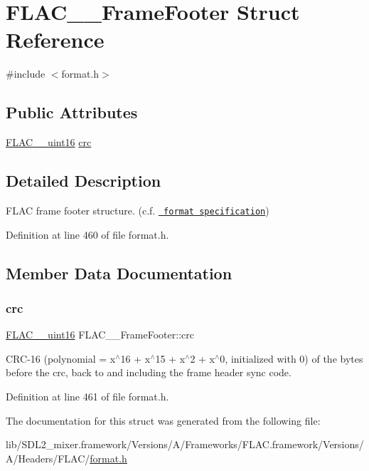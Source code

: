 \hypertarget{struct_f_l_a_c_____frame_footer}{}\section{F\+L\+A\+C\+\_\+\+\_\+\+Frame\+Footer Struct Reference}
\label{struct_f_l_a_c_____frame_footer}


{\ttfamily \#include $<$format.\+h$>$}

\subsection*{Public Attributes}
\begin{DoxyCompactItemize}
\item 
\mbox{\hyperlink{ordinals_8h_a0fbaee65d056a075245dcd0c903fb94c}{F\+L\+A\+C\+\_\+\+\_\+uint16}} \mbox{\hyperlink{struct_f_l_a_c_____frame_footer_abdd6d64bf281c49c720b97b955d4eee7}{crc}}
\end{DoxyCompactItemize}


\subsection{Detailed Description}
F\+L\+AC frame footer structure. (c.\+f. \href{../format.html\#frame_footer}{\texttt{ format specification}}) 

Definition at line 460 of file format.\+h.



\subsection{Member Data Documentation}
\mbox{\label{struct_f_l_a_c_____frame_footer_abdd6d64bf281c49c720b97b955d4eee7}} 
\subsubsection{\texorpdfstring{crc}{crc}}
{\footnotesize\ttfamily \mbox{\hyperlink{ordinals_8h_a0fbaee65d056a075245dcd0c903fb94c}{F\+L\+A\+C\+\_\+\+\_\+uint16}} F\+L\+A\+C\+\_\+\+\_\+\+Frame\+Footer\+::crc}

C\+R\+C-\/16 (polynomial = x$^\wedge$16 + x$^\wedge$15 + x$^\wedge$2 + x$^\wedge$0, initialized with 0) of the bytes before the crc, back to and including the frame header sync code. 

Definition at line 461 of file format.\+h.



The documentation for this struct was generated from the following file\+:\begin{DoxyCompactItemize}
\item 
lib/\+S\+D\+L2\+\_\+mixer.\+framework/\+Versions/\+A/\+Frameworks/\+F\+L\+A\+C.\+framework/\+Versions/\+A/\+Headers/\+F\+L\+A\+C/\mbox{\hyperlink{format_8h}{format.\+h}}\end{DoxyCompactItemize}

